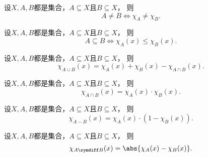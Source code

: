 \begin{proposition}
设\(X,A,B\)都是集合，\(A \subseteq X\)且\(B \subseteq X\)，
则\begin{equation*}
	A \neq B \iff \chi_A \neq \chi_B.
\end{equation*}
\end{proposition}

\begin{proposition}
设\(X,A,B\)都是集合，\(A \subseteq X\)且\(B \subseteq X\)，
则\begin{equation*}
	A \subseteq B
	\iff
	\chi_A(x) \leq \chi_B(x).
\end{equation*}
\end{proposition}

\begin{proposition}
设\(X,A,B\)都是集合，\(A \subseteq X\)且\(B \subseteq X\)，
则\begin{equation*}
	\chi_{A \cup B}(x)
	= \chi_A(x) + \chi_B(x) - \chi_{A \cap B}(x).
\end{equation*}
\end{proposition}

\begin{proposition}
设\(X,A,B\)都是集合，\(A \subseteq X\)且\(B \subseteq X\)，
则\begin{equation*}
	\chi_{A \cap B}(x)
	= \chi_A(x) \cdot \chi_B(x).
\end{equation*}
\end{proposition}

\begin{proposition}
设\(X,A,B\)都是集合，\(A \subseteq X\)且\(B \subseteq X\)，
则\begin{equation*}
	\chi_{A - B}(x)
	= \chi_A(x) \cdot (1 - \chi_B(x)).
\end{equation*}
\end{proposition}

\begin{proposition}
设\(X,A,B\)都是集合，\(A \subseteq X\)且\(B \subseteq X\)，
则\begin{equation*}
	\chi_{A \symdiff B}(x)
	= \abs{\chi_A(x) - \chi_B(x)}.
\end{equation*}
\end{proposition}

